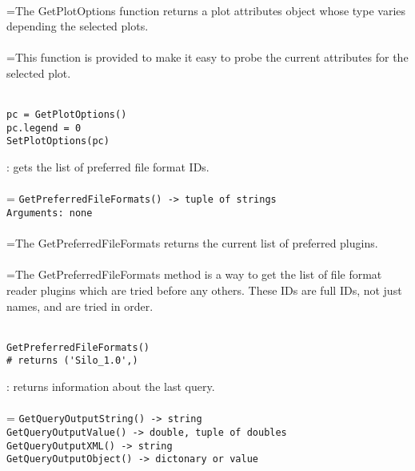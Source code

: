 \documentclass[10pt,a4paper]{report}
\begin{document}
 \\ 
\hangindent=\parindent The GetPlotOptions function returns a plot attributes object whose type varies depending the selected plots. \\[-3mm] 

 \\ 
\hangindent=\parindent This function is provided to make it easy to probe the current attributes for the selected plot. \\[-3mm] 

\\[-6mm]
\begin{verbatim}pc = GetPlotOptions()
pc.legend = 0
SetPlotOptions(pc)
\end{verbatim}
\newpage


{}
: gets the list of preferred file format IDs.\\[-3mm]

 \\ 
\hangindent=\parindent 
\verb!GetPreferredFileFormats() -> tuple of strings!\\ 
\verb!Arguments: none!\\ [-3mm]

 \\ 
\hangindent=\parindent The GetPreferredFileFormats returns the current list of preferred plugins. \\[-3mm] 

 \\ 
\hangindent=\parindent The GetPreferredFileFormats method is a way to get the list of file format reader plugins which are tried before any others. These IDs are full IDs, not just names, and are tried in order. \\[-3mm] 

\\[-6mm]
\begin{verbatim}GetPreferredFileFormats()
# returns ('Silo_1.0',)
\end{verbatim}
\newpage


{}
: returns information about the last query.\\[-3mm]

 \\ 
\hangindent=\parindent 
\verb!GetQueryOutputString() -> string!\\ 
\verb!GetQueryOutputValue() -> double, tuple of doubles!\\ 
\verb!GetQueryOutputXML() -> string!\\ 
\verb!GetQueryOutputObject() -> dictonary or value!\\ [-3mm]
\end{document}

